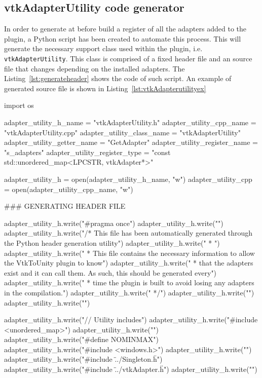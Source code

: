 \begin{appendices}
\chapter{vtkAdapterUtility code generator}
\label{apx:generate-register}
	
In order to generate at before build a register of all the adapters added to the plugin, a Python script has been created to automate this process. This will generate the necessary support class used within the plugin, i.e. \verb|vtkAdapterUtility|. This class is comprised of a fixed header file and an source file that changes depending on the installed adapters. The Listing~\ref{lst:generateheader} shows the code of such script. An example of generated source file is shown in Listing~\ref{lst:vtkAdapterutilityex}

\begin{python}[label=lst:generateheader,caption={generate-header.py script},aboveskip=20pt]
import os

adapter_utility_h_name = "vtkAdapterUtility.h"
adapter_utility_cpp_name = "vtkAdapterUtility.cpp"
adapter_utility_class_name = "vtkAdapterUtility"
adapter_utility_getter_name = "GetAdapter"
adapter_utility_register_name = "s_adapters"
adapter_utility_register_type = "const std::unordered_map<LPCSTR, vtkAdapter*>"

adapter_utility_h = open(adapter_utility_h_name, "w")
adapter_utility_cpp = open(adapter_utility_cpp_name, "w")



### GENERATING HEADER FILE

adapter_utility_h.write("#pragma once\n")
adapter_utility_h.write("\n")
adapter_utility_h.write("/* This file has been automatically generated through the Python header generation utility\n")
adapter_utility_h.write(" * \n")
adapter_utility_h.write(" * This file contains the necessary information to allow the VtkToUnity plugin to know\n")
adapter_utility_h.write(" * that the adapters exist and it can call them. As such, this should be generated every\n")
adapter_utility_h.write(" * time the plugin is built to avoid losing any adapters in the compilation.\n")
adapter_utility_h.write(" */\n")
adapter_utility_h.write("\n")
adapter_utility_h.write("\n")

adapter_utility_h.write("// Utility includes\n")
adapter_utility_h.write("#include <unordered_map>\n")
adapter_utility_h.write("\n")
adapter_utility_h.write("#define NOMINMAX\n")
adapter_utility_h.write("#include <windows.h>\n")
adapter_utility_h.write("\n")
adapter_utility_h.write("#include \"../Singleton.h\"\n")
adapter_utility_h.write("#include \"../vtkAdapter.h\"\n")
adapter_utility_h.write("\n")



\end{python}
\end{appendices}
